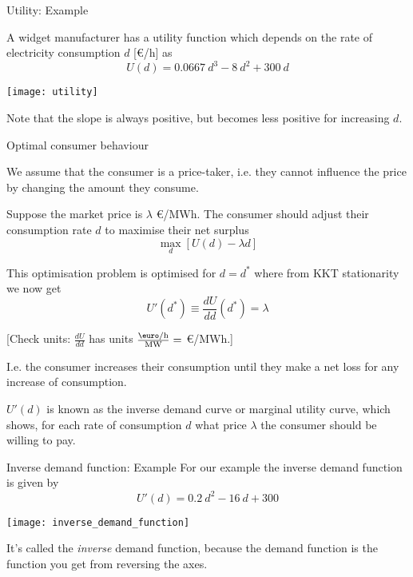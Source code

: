 \documentclass[10pt,aspectratio=169,dvipsnames]{beamer}
\def\l{\lambda}
\begin{document}
\begin{frame}{Utility: Example}


  A widget manufacturer has a utility function which depends on the
  rate of electricity consumption $d$ [\euro/h] as
  \begin{equation*}
    U(d) = 0.0667~d^3  - 8~d^2 + 300~d
  \end{equation*}


  \centering
  \texttt{[image: utility]}

  \raggedright
  Note that the slope is always positive, but becomes less positive
  for increasing $d$.
\end{frame}


\begin{frame}{Optimal consumer behaviour}



  We assume that the consumer is a \alert{price-taker},
  i.e. they cannot influence the price by changing the amount they
  consume.

  Suppose the market price is $\lambda$ \euro/MWh. The consumer should
  adjust their consumption rate $d$ to maximise their \alert{net surplus}
  \begin{equation*}
    \max_d \left[U(d) - \l d \right]
  \end{equation*}

  This optimisation problem is optimised for $d=d^*$ where from KKT stationarity we now get
  \begin{equation*}
    U'(d^*) \equiv \frac{dU}{dd} (d^*) =  \l
  \end{equation*}

  [Check units: $\frac{dU}{dd}$ has units $\frac{\textrm{\euro/h}}{\textrm{MW}} = $ \euro/MWh.]

  I.e. the consumer increases their consumption until they make a net loss for any increase of consumption.

  $U'(d)$ is known as the \alert{inverse demand curve} or \alert{marginal utility curve}, which shows,
  for each rate of consumption $d$ what price $\l$ the consumer should be
  willing to pay.


\end{frame}



\begin{frame}{Inverse demand function: Example}
  For our example the inverse demand function is given by
  \begin{equation*}
    U'(d) = 0.2~d^2 - 16~d + 300
  \end{equation*}

  \centering
  \texttt{[image: inverse\_demand\_function]}

  \raggedright
  It's called the \emph{inverse} demand function, because the demand function is the function you get from reversing the axes.
\end{frame}
\end{document}
